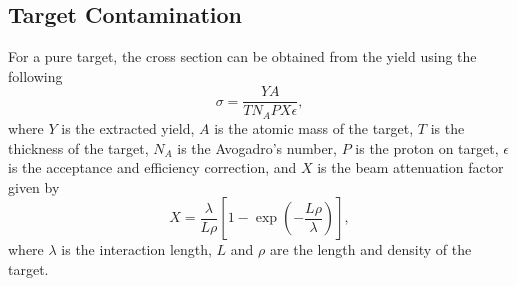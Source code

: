\documentclass[../main.tex]{subfiles}
\begin{document}
\subsection{Target Contamination}
For a pure target, the cross section can be obtained from the yield using the following
\begin{equation}
	\sigma = \frac{Y A}{T N_A P X \epsilon},
\end{equation}
where $Y$ is the extracted yield, $A$ is the atomic mass of the target,
$T$ is the thickness of the target, $N_A$ is the Avogadro’s number,
$P$ is the proton on target, $\epsilon$ is the acceptance and efficiency correction,
and $X$ is the beam attenuation factor given by
\begin{equation}
	X=\frac{\lambda}{L\rho} \left[1-\exp\left(-\frac{L\rho}{\lambda}\right)\right],
\end{equation}
where $\lambda$ is the interaction length, $L$ and $\rho$ are the length and density
of the target.
\end{document}
